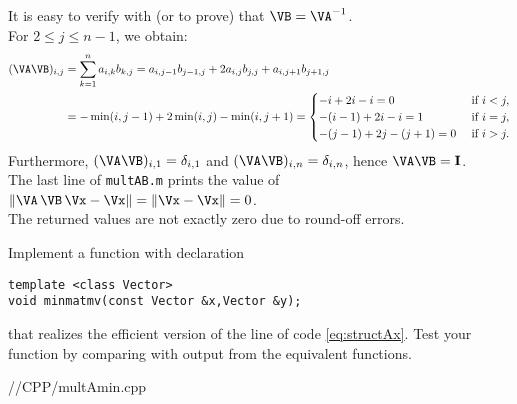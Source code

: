 \begin{problem}
\begin{subproblem}[2]
\begin{solution}
It is easy to verify with \Matlab (or to prove) that $\VB=\VA^{-1}$.\\
For $2 \leq j \leq n-1$, we obtain:
%
\begin{equation*}
\begin{aligned}
(\VA\VB)_{i,j} &= \sum_{k=1}^n a_{i,k} b_{k,j}
= a_{i,j-1} b_{j-1,j} + 2 a_{i,j} b_{j,j} + a_{i,j+1} b_{j+1,j} \\
&= -\min(i,j-1) + 2 \min(i,j) - \min(i,j+1)
= \begin{cases}
-i + 2i - i = 0 & \text{ if } i<j, \\
-(i-1) + 2i - i = 1 & \text{ if } i=j, \\
-(j-1) + 2j - (j+1) = 0 & \text{ if } i>j.
\end{cases}
\end{aligned}
\end{equation*}
%
Furthermore, $(\VA\VB)_{i,1} = \delta_{i,1}$ and $(\VA\VB)_{i,n} = \delta_{i,n}$, hence $\VA\VB = {\bf I}$.\\
The last line of \texttt{multAB.m} prints the value of $\|\VA\,\VB\,\Vx-\Vx\|=\|\Vx-\Vx\|=0$.\\
The returned values are not exactly zero due to round-off errors.

\end{solution}
\end{subproblem}

\begin{subproblem}[2] \label{sp:smv:cpp1}
  Implement a \Cpp{} function with declaration
\begin{lstlisting}
template <class Vector>
void minmatmv(const Vector &x,Vector &y);    
\end{lstlisting}
that realizes the efficient version of the \matlab{} line of 
code \eqref{eq:structAx}. Test your function by comparing
with output from the equivalent \matlab{} functions. 

  \begin{solution}
    
 
{\problems/\chpt/CPP/multAmin.cpp}
    
  \end{solution}
  
\end{subproblem}

\end{problem}

%
